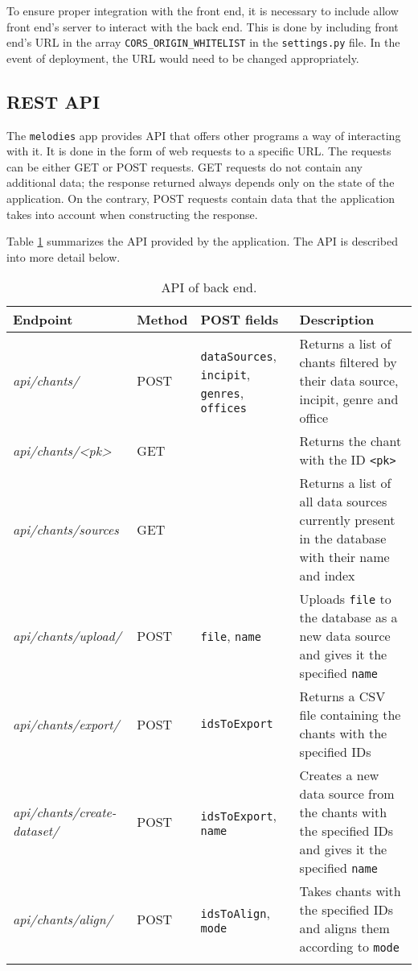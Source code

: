 To ensure proper integration with the front end, it is necessary to include allow front end's server to interact with the back end. This is done by
including front end's URL in the array \verb|CORS_ORIGIN_WHITELIST| in the \verb|settings.py| file. In the event of deployment, the URL
would need to be changed appropriately.

\subsection{REST API}
\label{section:api}

The \verb|melodies| app provides API that offers other programs a way of interacting with it. It is done in the form of web requests to a specific URL. The requests
can be either GET or POST requests. GET requests do not contain any additional data; the response returned always depends only on the state of the application. On
the contrary, POST requests contain data that the application takes into account when constructing the response.

Table \ref{table:api} summarizes the API provided by the application. The API is described into more detail below.

\begin{longtable}{| p{} | p{} | p{} | p{} |}

 \hline
 Endpoint & Method & POST fields & Description \\
 \hline
\emph{api/chants/}                & POST & \verb|dataSources|, \verb|incipit|, \verb|genres|, \verb|offices| & Returns a list of chants filtered by their data source, incipit, genre and office\\
\emph{api/chants/\textless pk\textgreater} & GET  &                                                          & Returns the chant with the ID \verb|<pk>|\\
\emph{api/chants/sources}         & GET  &                                                                   & Returns a list of all data sources currently present in the database with their name and index\\
\emph{api/chants/upload/}         & POST & \verb|file|, \verb|name|                                          & Uploads \verb|file| to the database as a new data source and gives it the specified \verb|name|\\
\emph{api/chants/export/}         & POST & \verb|idsToExport|                                                & Returns a CSV file containing the chants with the specified IDs\\
\emph{api/chants/create-dataset/} & POST & \verb|idsToExport|, \verb|name|                                   & Creates a new data source from the chants with the specified IDs and gives it the specified \verb|name|\\
\emph{api/chants/align/}          & POST & \verb|idsToAlign|, \verb|mode|                                    & Takes chants with the specified IDs and aligns them according to \verb|mode|\\
 \hline

\caption{API of back end.}
\label{table:api}
\end{longtable}

